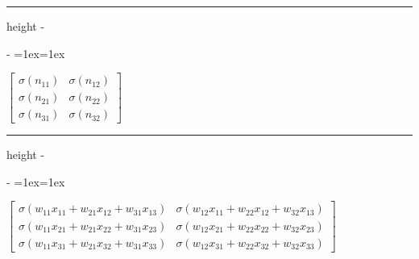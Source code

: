\documentclass[letterpaper,10pt,english]{sphinxmanual}
\makeatletter
\newenvironment{nbsphinxfancyoutput}{%
    \let\sphinxincludegraphics\nbsphinxincludegraphics
    \nbsphinx@image@maxheight\textheight
    \advance\nbsphinx@image@maxheight -2\fboxsep   %
    \advance\nbsphinx@image@maxheight -2\fboxrule  %
    \advance\nbsphinx@image@maxheight -\baselineskip
\def\nbsphinxfcolorbox{\spx@fcolorbox{nbsphinx-code-border}{white}}%
\def\FrameCommand{\nbsphinxfcolorbox\nbsphinxfancyaddprompt\@empty}%
\def\FirstFrameCommand{\nbsphinxfcolorbox\nbsphinxfancyaddprompt\sphinxVerbatim@Continues}%
\def\MidFrameCommand{\nbsphinxfcolorbox\sphinxVerbatim@Continued\sphinxVerbatim@Continues}%
\def\LastFrameCommand{\nbsphinxfcolorbox\sphinxVerbatim@Continued\@empty}%
\MakeFramed{\advance\hsize-\width\@totalleftmargin\z@\linewidth\hsize\@setminipage}%
\lineskip=1ex\lineskiplimit=1ex\raggedright%
}{\par\unskip\@minipagefalse\endMakeFramed}
\def\nbsphinxfancyaddprompt{\ifvoid\nbsphinxpromptbox\else
    \kern\fboxrule\kern\fboxsep
    \copy\nbsphinxpromptbox
    \kern-\ht\nbsphinxpromptbox\kern-\dp\nbsphinxpromptbox
    \kern-\fboxsep\kern-\fboxrule\nointerlineskip
    \fi}
\newlength\nbsphinxcodecellspacing
\newcommand*{\nbsphinxincludegraphics}[2][]{%
    \gdef\spx@includegraphics@options{#1}%
    \setbox\spx@image@box\hbox{\texttt{[image: \#2]}}%
    \in@false
    \ifdim \wd\spx@image@box>\linewidth
      \g@addto@macro\spx@includegraphics@options{,width=\linewidth}%
      \in@true
    \fi
    \ifdim \ht\spx@image@box>\nbsphinx@image@maxheight
      \g@addto@macro\spx@includegraphics@options{,height=\nbsphinx@image@maxheight}%
      \in@true
    \fi
    \ifin@
      \g@addto@macro\spx@includegraphics@options{,keepaspectratio}%
    \fi
    \setbox\spx@image@box\box\voidb@x %
    \expandafter\includegraphics\expandafter[\spx@includegraphics@options]{#2}%
}%
\makeatother
\begin{document}
{
\begin{sphinxVerbatim}[commandchars=\\\{\}]
\llap{\color{nbsphinxin}[38]:\,\hspace{\fboxrule}\hspace{\fboxsep}}
\end{sphinxVerbatim}
}

\hrule height -\fboxrule\relax
\vspace{\nbsphinxcodecellspacing}

\savebox\nbsphinxpromptbox[0pt][r]{\color{nbsphinxout}\Verb|\strut{[38]:}\,|}

\begin{nbsphinxfancyoutput}
$\displaystyle \left[\begin{matrix}\sigma{\left(n_{11} \right)} & \sigma{\left(n_{12} \right)}\\\sigma{\left(n_{21} \right)} & \sigma{\left(n_{22} \right)}\\\sigma{\left(n_{31} \right)} & \sigma{\left(n_{32} \right)}\end{matrix}\right]$
\end{nbsphinxfancyoutput}

{
\begin{sphinxVerbatim}[commandchars=\\\{\}]
\llap{\color{nbsphinxin}[39]:\,\hspace{\fboxrule}\hspace{\fboxsep}}
\end{sphinxVerbatim}
}

\hrule height -\fboxrule\relax
\vspace{\nbsphinxcodecellspacing}

\savebox\nbsphinxpromptbox[0pt][r]{\color{nbsphinxout}\Verb|\strut{[39]:}\,|}

\begin{nbsphinxfancyoutput}
$\displaystyle \left[\begin{matrix}\sigma{\left(w_{11} x_{11} + w_{21} x_{12} + w_{31} x_{13} \right)} & \sigma{\left(w_{12} x_{11} + w_{22} x_{12} + w_{32} x_{13} \right)}\\\sigma{\left(w_{11} x_{21} + w_{21} x_{22} + w_{31} x_{23} \right)} & \sigma{\left(w_{12} x_{21} + w_{22} x_{22} + w_{32} x_{23} \right)}\\\sigma{\left(w_{11} x_{31} + w_{21} x_{32} + w_{31} x_{33} \right)} & \sigma{\left(w_{12} x_{31} + w_{22} x_{32} + w_{32} x_{33} \right)}\end{matrix}\right]$
\end{nbsphinxfancyoutput}
\end{document}
